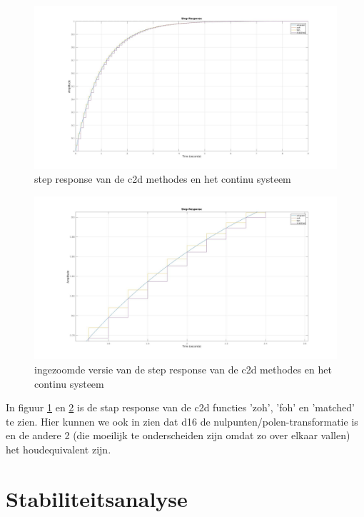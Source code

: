 \documentclass[a4paper, 12pt]{article}
\begin{document}
\begin{figure}[!h]
	\includegraphics[width=1\linewidth]{Labo3_c2d_stepresponse.jpg}
	\caption{step response van de c2d methodes en het continu systeem}
	\label{labo3_step_response3}
\end{figure}

\begin{figure}[!h]
	\includegraphics[width=1\linewidth]{Labo3_c2d_stepresponse2.jpg}
	\caption{ingezoomde versie van de step response van de c2d methodes en het continu systeem}
	\label{labo3_step_response4}
\end{figure}

In figuur \ref{labo3_step_response3} en \ref{labo3_step_response4} is de stap response van de c2d functies 'zoh', 'foh' en 'matched' te zien. Hier kunnen we ook in zien dat d16 de nulpunten/polen-transformatie is en de andere 2 (die moeilijk te onderscheiden zijn omdat zo over elkaar vallen) het houdequivalent zijn.

\newpage

\section{Stabiliteitsanalyse}
\end{document}
